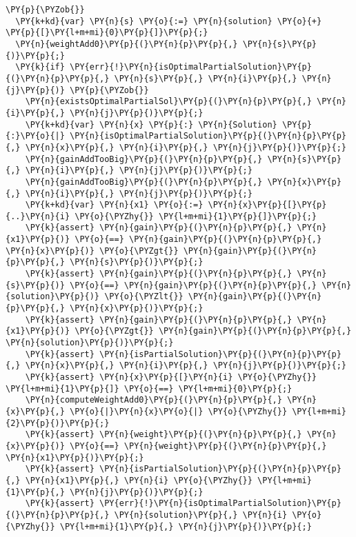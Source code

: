\begin{sloppypar}
\begin{enumerate}
\begin{Verbatim}[commandchars=\\\{\}]
\PY{p}{\PYZob{}}
  \PY{k+kd}{var} \PY{n}{s} \PY{o}{:=} \PY{n}{solution} \PY{o}{+} \PY{p}{[}\PY{l+m+mi}{0}\PY{p}{]}\PY{p}{;}
  \PY{n}{weightAdd0}\PY{p}{(}\PY{n}{p}\PY{p}{,} \PY{n}{s}\PY{p}{)}\PY{p}{;}
  \PY{k}{if} \PY{err}{!}\PY{n}{isOptimalPartialSolution}\PY{p}{(}\PY{n}{p}\PY{p}{,} \PY{n}{s}\PY{p}{,} \PY{n}{i}\PY{p}{,} \PY{n}{j}\PY{p}{)} \PY{p}{\PYZob{}}
    \PY{n}{existsOptimalPartialSol}\PY{p}{(}\PY{n}{p}\PY{p}{,} \PY{n}{i}\PY{p}{,} \PY{n}{j}\PY{p}{)}\PY{p}{;}
    \PY{k+kd}{var} \PY{n}{x} \PY{p}{:} \PY{n}{Solution} \PY{p}{:}\PY{o}{|} \PY{n}{isOptimalPartialSolution}\PY{p}{(}\PY{n}{p}\PY{p}{,} \PY{n}{x}\PY{p}{,} \PY{n}{i}\PY{p}{,} \PY{n}{j}\PY{p}{)}\PY{p}{;}
    \PY{n}{gainAddTooBig}\PY{p}{(}\PY{n}{p}\PY{p}{,} \PY{n}{s}\PY{p}{,} \PY{n}{i}\PY{p}{,} \PY{n}{j}\PY{p}{)}\PY{p}{;}
    \PY{n}{gainAddTooBig}\PY{p}{(}\PY{n}{p}\PY{p}{,} \PY{n}{x}\PY{p}{,} \PY{n}{i}\PY{p}{,} \PY{n}{j}\PY{p}{)}\PY{p}{;}
    \PY{k+kd}{var} \PY{n}{x1} \PY{o}{:=} \PY{n}{x}\PY{p}{[}\PY{p}{..}\PY{n}{i} \PY{o}{\PYZhy{}} \PY{l+m+mi}{1}\PY{p}{]}\PY{p}{;}
    \PY{k}{assert} \PY{n}{gain}\PY{p}{(}\PY{n}{p}\PY{p}{,} \PY{n}{x1}\PY{p}{)} \PY{o}{==} \PY{n}{gain}\PY{p}{(}\PY{n}{p}\PY{p}{,} \PY{n}{x}\PY{p}{)} \PY{o}{\PYZgt{}} \PY{n}{gain}\PY{p}{(}\PY{n}{p}\PY{p}{,} \PY{n}{s}\PY{p}{)}\PY{p}{;}  
    \PY{k}{assert} \PY{n}{gain}\PY{p}{(}\PY{n}{p}\PY{p}{,} \PY{n}{s}\PY{p}{)} \PY{o}{==} \PY{n}{gain}\PY{p}{(}\PY{n}{p}\PY{p}{,} \PY{n}{solution}\PY{p}{)} \PY{o}{\PYZlt{}} \PY{n}{gain}\PY{p}{(}\PY{n}{p}\PY{p}{,} \PY{n}{x}\PY{p}{)}\PY{p}{;}
    \PY{k}{assert} \PY{n}{gain}\PY{p}{(}\PY{n}{p}\PY{p}{,} \PY{n}{x1}\PY{p}{)} \PY{o}{\PYZgt{}} \PY{n}{gain}\PY{p}{(}\PY{n}{p}\PY{p}{,} \PY{n}{solution}\PY{p}{)}\PY{p}{;}
    \PY{k}{assert} \PY{n}{isPartialSolution}\PY{p}{(}\PY{n}{p}\PY{p}{,} \PY{n}{x}\PY{p}{,} \PY{n}{i}\PY{p}{,} \PY{n}{j}\PY{p}{)}\PY{p}{;}
    \PY{k}{assert} \PY{n}{x}\PY{p}{[}\PY{n}{i} \PY{o}{\PYZhy{}} \PY{l+m+mi}{1}\PY{p}{]} \PY{o}{==} \PY{l+m+mi}{0}\PY{p}{;}
    \PY{n}{computeWeightAdd0}\PY{p}{(}\PY{n}{p}\PY{p}{,} \PY{n}{x}\PY{p}{,} \PY{o}{|}\PY{n}{x}\PY{o}{|} \PY{o}{\PYZhy{}} \PY{l+m+mi}{2}\PY{p}{)}\PY{p}{;}
    \PY{k}{assert} \PY{n}{weight}\PY{p}{(}\PY{n}{p}\PY{p}{,} \PY{n}{x}\PY{p}{)} \PY{o}{==} \PY{n}{weight}\PY{p}{(}\PY{n}{p}\PY{p}{,} \PY{n}{x1}\PY{p}{)}\PY{p}{;}
    \PY{k}{assert} \PY{n}{isPartialSolution}\PY{p}{(}\PY{n}{p}\PY{p}{,} \PY{n}{x1}\PY{p}{,} \PY{n}{i} \PY{o}{\PYZhy{}} \PY{l+m+mi}{1}\PY{p}{,} \PY{n}{j}\PY{p}{)}\PY{p}{;}
    \PY{k}{assert} \PY{err}{!}\PY{n}{isOptimalPartialSolution}\PY{p}{(}\PY{n}{p}\PY{p}{,} \PY{n}{solution}\PY{p}{,} \PY{n}{i} \PY{o}{\PYZhy{}} \PY{l+m+mi}{1}\PY{p}{,} \PY{n}{j}\PY{p}{)}\PY{p}{;}

\end{Verbatim}
\end{enumerate}
\end{sloppypar}
